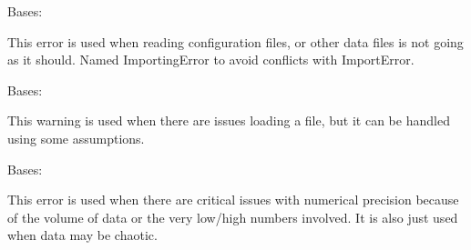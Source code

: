 \documentclass[letterpaper,10pt,english]{sphinxmanual}
\begin{document}

\begin{fulllineitems}
\label{\detokenize{python_docstrings/IfA_Smeargle.meta.errors:IfA_Smeargle.meta.errors.ImportingError}}
Bases: {\hyperref[\detokenize{python_docstrings/IfA_Smeargle.meta.errors:IfA_Smeargle.meta.errors.Smeargle_Exception}]{}}

This error is used when reading configuration files, or other data files
is not going as it should. Named ImportingError to avoid conflicts with
ImportError.

\end{fulllineitems}


\begin{fulllineitems}
\label{\detokenize{python_docstrings/IfA_Smeargle.meta.errors:IfA_Smeargle.meta.errors.ImportingWarning}}
Bases: {\hyperref[\detokenize{python_docstrings/IfA_Smeargle.meta.errors:IfA_Smeargle.meta.errors.Smeargle_Warning}]{}}

This warning is used when there are issues loading a file, but it can
be handled using some assumptions.

\end{fulllineitems}


\begin{fulllineitems}
\label{\detokenize{python_docstrings/IfA_Smeargle.meta.errors:IfA_Smeargle.meta.errors.ImprecisionError}}
Bases: {\hyperref[\detokenize{python_docstrings/IfA_Smeargle.meta.errors:IfA_Smeargle.meta.errors.Smeargle_Exception}]{}}

This error is used when there are critical issues with numerical
precision because of the volume of data or the very low/high numbers
involved. It is also just used when data may be chaotic.

\end{fulllineitems}
\end{document}
